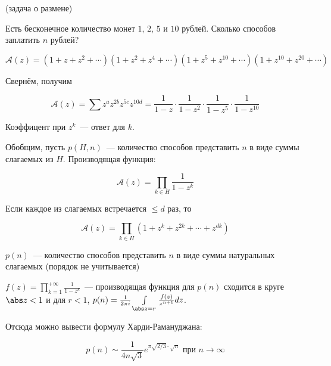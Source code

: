 \begin{example}(задача о размене)

    Есть бесконечное количество монет $1$, $2$, $5$ и $10$ рублей.
    Сколько способов заплатить $n$ рублей?

    \[
        \mathscr A(z) =
        \left(1 + z + z^2 + \cdots\right)
        \left(1 + z^2 + z^4 + \cdots\right)
        \left(1 + z^5 + z^{10} + \cdots\right)
        \left(1 + z^{10} + z^{20} + \cdots\right)
    \]

    Свернём, получим

    \[
        \mathscr A(z) = \sum z^az^{2b}z^{5c}z^{10d}
        = \frac{1}{1-z}\cdot\frac{1}{1-z^2}\cdot
        \frac{1}{1-z^5}\cdot\frac{1}{1-z^{10}}
    \]

    Коэффицент при $z^k$~--- ответ для $k$.

    Обобщим, пусть $p(H, n)$~--- количество способов
    представить $n$ в виде суммы слагаемых из $H$.
    Производящая функция:

    \[
        \mathscr A(z) = \prod_{k\in H} \frac{1}{1-z^k}
    \]

    Если каждое из слагаемых встречается $\le d$ раз,
    то

    \[
        \mathscr A(z) = \prod_{k\in H} \left(
        1+z^k+z^{2k}+\cdots+z^{dk}
        \right)
    \]
\end{example}

\begin{definition}
    $p(n)$~--- количество способов представить
    $n$ в виде суммы натуральных слагаемых (порядок не учитывается)
\end{definition}

\begin{theorem}
    $f(z) = \prod_{k=1}^{+\infty} \frac{1}{1-z^k}$~---
    производящая функция для $p(n)$ сходится в круге
    $\abs z < 1$ и для $r < 1$, $p(n) = \frac{1}{2\pi i} \int\limits_{\abs z = r}
        \frac{f(z)}{z^{n+1}}dz$.
\end{theorem}

\begin{observation}
    Отсюда можно вывести формулу Харди-Рамануджана:

    \[
        p(n) \sim \frac{1}{4n\sqrt 3} e^{\pi \sqrt{2/3} \cdot \sqrt{n}}
        \text{ при } n \to \infty
    \]
\end{observation}

